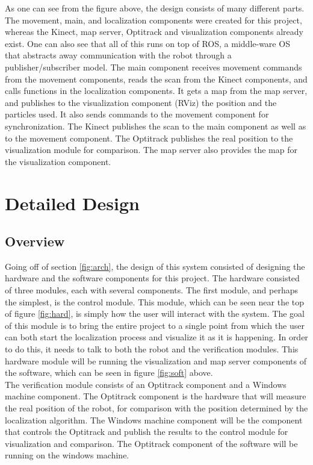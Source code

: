 \documentclass{article}
\newcommand\tab[1][0.5cm]{\hspace*{#1}}
\begin{document}
As one can see from the figure above, the design consists of many different parts. The movement, main, and localization components were created for this project, whereas the Kinect, map server, Optitrack and visualization components already exist. One can also see that all of this runs on top of ROS, a middle-ware OS that abstracts away communication with the robot through a publisher/subscriber model. The main component receives movement commands from the movement components, reads the scan from the Kinect components, and calls functions in the localization components. It gets a map from the map server, and publishes to the visualization component (RViz) the position and the particles used. It also sends commands to the movement component for synchronization. The Kinect publishes the scan to the main component as well as to the movement component. The Optitrack publishes the real position to the visualization module for comparison. The map server also provides the map for the visualization component.

\section{Detailed Design}

\subsection{Overview}
\tab Going off of section \ref{fig:arch}, the design of this system consisted of designing the hardware and the software components for this project. The hardware consisted of three modules, each with several components. The first module, and perhaps the simplest, is the control module. This module, which can be seen near the top of figure \ref{fig:hard}, is simply how the user will interact with the system. The goal of this module is to bring the entire project to a single point from which the user can both start the localization process and visualize it as it is happening. In order to do this, it needs to talk to both the robot and the verification modules. This hardware module will be running the visualization and map server components of the software, which can be seen in figure \ref{fig:soft} above.\\

The verification module consists of an Optitrack component and a Windows machine component. The Optitrack component is the hardware that will measure the real position of the robot, for comparison with the position determined by the localization algorithm. The Windows machine component will be the component that controls the Optitrack and publish the results to the control module for visualization and comparison. The Optitrack component of the software will be running on the windows machine.\\
\end{document}
